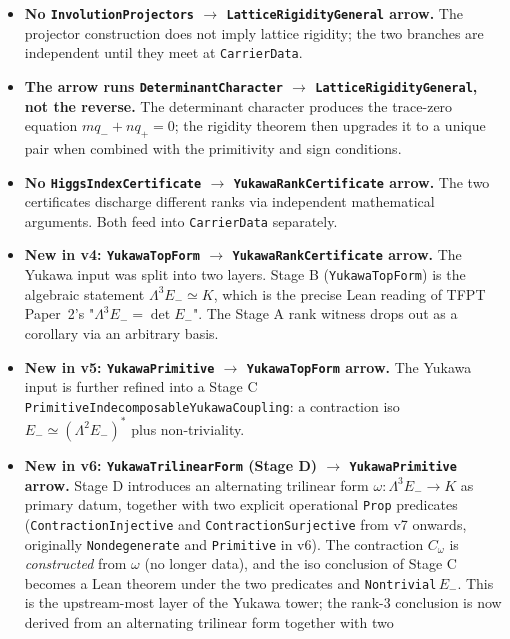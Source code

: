 \begin{itemize}[leftmargin=1.6em, itemsep=2pt]
\item \textbf{No \texttt{InvolutionProjectors} $\to$
    \texttt{LatticeRigidityGeneral} arrow.} The projector
    construction does not imply lattice rigidity; the two
    branches are independent until they meet at
    \texttt{CarrierData}.
\item \textbf{The arrow runs \texttt{DeterminantCharacter} $\to$
    \texttt{LatticeRigidityGeneral}, not the reverse.} The
    determinant character produces the trace-zero equation
    $m q_- + n q_+ = 0$; the rigidity theorem then upgrades it to
    a unique pair when combined with the primitivity and sign
    conditions.
\item \textbf{No \texttt{HiggsIndexCertificate} $\to$
    \texttt{YukawaRankCertificate} arrow.} The two certificates
    discharge different ranks via independent mathematical
    arguments. Both feed into \texttt{CarrierData} separately.
\item \textbf{New in v4: \texttt{YukawaTopForm} $\to$
    \texttt{YukawaRankCertificate} arrow.} The Yukawa input was
    split into two layers. Stage B (\texttt{YukawaTopForm})
    is the algebraic statement $\Lambda^3 E_- \simeq K$, which is
    the precise Lean reading of TFPT Paper~2's "$\Lambda^3 E_- =
    \det E_-$". The Stage A rank witness drops out as a corollary
    via an arbitrary basis.
\item \textbf{New in v5: \texttt{YukawaPrimitive} $\to$
    \texttt{YukawaTopForm} arrow.} The Yukawa input is further
    refined into a Stage C
    \texttt{PrimitiveIndecomposableYukawaCoupling}: a
    contraction iso $E_- \simeq (\Lambda^2 E_-)^*$ plus
    non-triviality.
\item \textbf{New in v6: \texttt{YukawaTrilinearForm} (Stage D)
    $\to$ \texttt{YukawaPrimitive} arrow.} Stage D introduces an
    alternating trilinear form $\omega : \Lambda^3 E_- \to K$ as
    primary datum, together with two explicit operational
    \texttt{Prop} predicates (\texttt{ContractionInjective} and
    \texttt{ContractionSurjective} from v7 onwards, originally
    \texttt{Nondegenerate} and \texttt{Primitive} in v6).
    The contraction $C_\omega$ is \emph{constructed} from
    $\omega$ (no longer data), and the iso conclusion of Stage C
    becomes a Lean theorem under the two predicates and
    \texttt{Nontrivial}\,$E_-$. This is the upstream-most layer
    of the Yukawa tower; the rank-3 conclusion is now derived
    from an alternating trilinear form together with two

\end{itemize}
